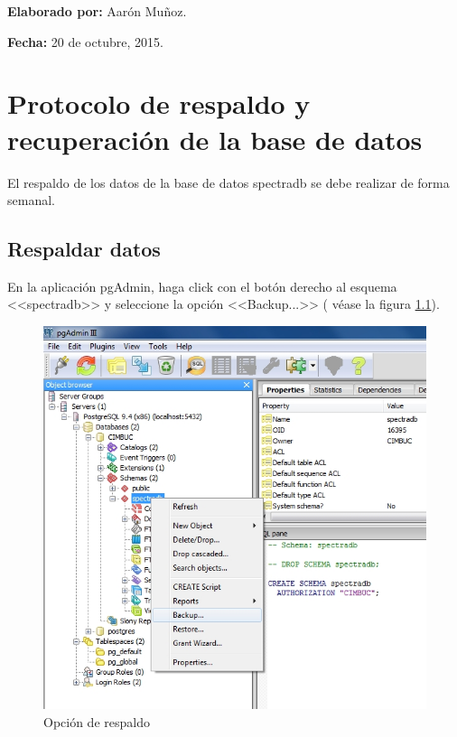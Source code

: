 {\begin{minipage}[t]{0.45\textwidth}
	\begin{flushleft}
		\textbf{Elaborado por:} Aar\'{o}n Mu\~{n}oz.
	\end{flushleft}
\end{minipage}
\begin{minipage}[t]{0.45\textwidth}
	\begin{flushright}
		\begin{center}
			\textbf{Fecha:} 20 de octubre, 2015.
		\end{center}
	\end{flushright}
\end{minipage}
\vfill
\newpage
\fontsize{12pt}{12pt}\selectfont
\fancyheadoffset{0cm}
\chapter{Protocolo de respaldo y recuperaci\'{o}n de la base de datos}
\thispagestyle{fancy}

El respaldo de los datos de la base de datos spectradb se debe realizar de forma semanal.

\section*{Respaldar datos}

En la aplicaci\'{o}n pgAdmin, haga click con el bot\'{o}n derecho al esquema <<spectradb>> y seleccione la opci\'{o}n <<Backup...>> ( v\'{e}ase la figura \ref{fig:respaldar1}).
\vfill
\begin{figure}[H]
  \centering
  \includegraphics[width=.7\linewidth]{./img/respaldar1.jpg}
\caption[]{Opci\'{o}n de respaldo\label{fig:respaldar1}}
\end{figure}
\vfill
\newpage

}

